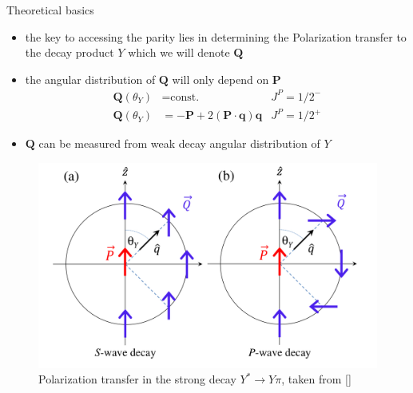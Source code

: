 \documentclass[11pt,aspectratio=1610,dvipsnames]{beamer}
\begin{document}
\begin{frame}{Theoretical basics}
	\begin{minipage}{.59\linewidth}
			\begin{tcolorbox}[colback=black!10,colframe=gray!20!black,title=Measuring parity] 
			\begin{itemize}
				\item the key to accessing the parity lies in determining the Polarization transfer to the decay product $Y$ which we will denote $\mathbf{Q}$
				\item the angular distribution of $\mathbf{Q}$ will only depend on $\mathbf{P}$
				\begin{align*}
				\mathbf{Q}(\theta_Y)&=\text{const.} & J^P=1/2^-\\
				\mathbf{Q}(\theta_Y)&=-\mathbf{P}+2(\mathbf{P}\cdot \mathbf{q})\mathbf{q} & J^P=1/2^+
				\end{align*}
				
				\item $\mathbf{Q}$ can be measured from weak decay angular distribution of  $Y$ 
				
			\end{itemize}
		\end{tcolorbox}		
	\end{minipage}
\begin{minipage}{.4\linewidth}
	\begin{figure}[H]
		\centering
		\includegraphics[width=\linewidth]{pol}
		\caption{Polarization transfer in the strong decay $Y^*\to Y\pi$, taken from [\cite{spinparity}]}
	\end{figure}
\end{minipage}

	\begin{flushright}
	\end{flushright}
\end{frame}
\end{document}
